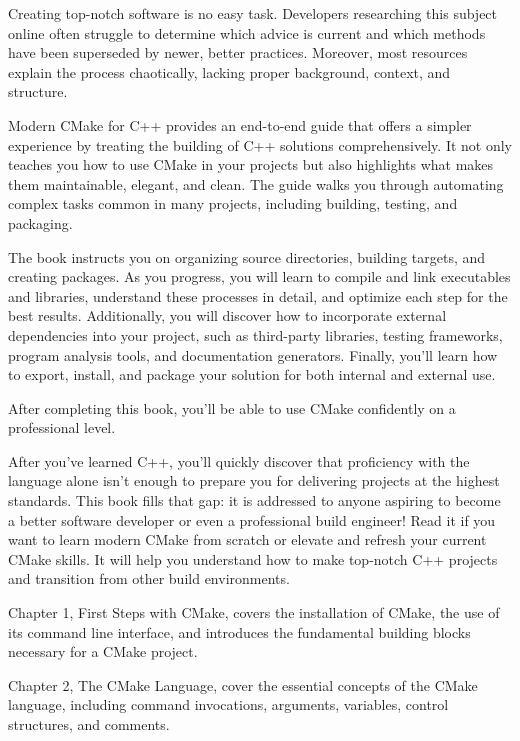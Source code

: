 


Creating top-notch software is no easy task. Developers researching this subject online often struggle to determine which advice is current and which methods have been superseded by newer, better practices. Moreover, most resources explain the process chaotically, lacking proper background, context, and structure.

Modern CMake for C++ provides an end-to-end guide that offers a simpler experience by treating the building of C++ solutions comprehensively. It not only teaches you how to use CMake in your projects but also highlights what makes them maintainable, elegant, and clean. The guide walks you through automating complex tasks common in many projects, including building, testing, and packaging.

The book instructs you on organizing source directories, building targets, and creating packages. As you progress, you will learn to compile and link executables and libraries, understand these processes in detail, and optimize each step for the best results. Additionally, you will discover how to incorporate external dependencies into your project, such as third-party libraries, testing frameworks, program analysis tools, and documentation generators. Finally, you’ll learn how to export, install, and package your solution for both internal and external use.

After completing this book, you’ll be able to use CMake confidently on a professional level.


After you’ve learned C++, you’ll quickly discover that proficiency with the language alone isn’t enough to prepare you for delivering projects at the highest standards. This book fills that gap: it is addressed to anyone aspiring to become a better software developer or even a professional build engineer! Read it if you want to learn modern CMake from scratch or elevate and refresh your current CMake skills. It will help you understand how to make top-notch C++ projects and transition from other build environments.


Chapter 1, First Steps with CMake, covers the installation of CMake, the use of its command line interface, and introduces the fundamental building blocks necessary for a CMake project.

Chapter 2, The CMake Language, cover the essential concepts of the CMake language, including command invocations, arguments, variables, control structures, and comments.

